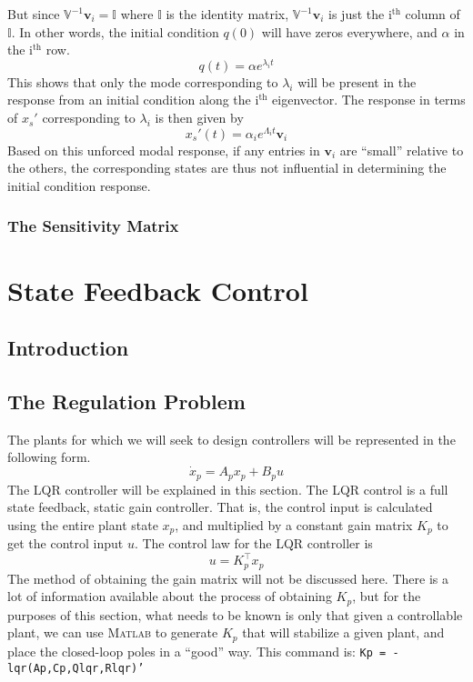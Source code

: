 But since $\mathbb{V}^{-1}\mathrm{\textbf{v}}_{i}=\mathbb{I}$ where $\mathbb{I}$ is the identity matrix, $\mathbb{V}^{-1}\mathrm{\textbf{v}}_{i}$ is just the $\mathrm{i^{th}}$ column of $\mathbb{I}$.
In other words, the initial condition $q(0)$ will have zeros everywhere, and $\alpha$ in the $\mathrm{i^{th}}$ row.
\begin{equation*}
  q(t)=\alpha e^{\lambda_{i}t}
\end{equation*}
This shows that only the mode corresponding to $\lambda_{i}$ will be present in the response from an initial condition along the $\mathrm{i^{th}}$ eigenvector.
The response in terms of $x_{s}'$ corresponding to $\lambda_{i}$ is then given by
\begin{equation*}
  x_{s}'(t)=\alpha_{i}e^{\Lambda_{i}t}\mathrm{\textbf{v}}_{i}
\end{equation*}
Based on this unforced modal response, if any entries in $\mathrm{\textbf{v}}_{i}$ are ``small'' relative to the others, the corresponding states are thus not influential in determining the initial condition response.

\subsection{The Sensitivity Matrix}


\chapter{State Feedback Control}

\section{Introduction}

\section{The Regulation Problem}

The plants for which we will seek to design controllers will be represented in the following form.
\begin{equation*}
  \dot{x}_{p}=A_{p}x_{p}+B_{p}u
\end{equation*}
The LQR controller will be explained in this section.
The LQR control is a full state feedback, static gain controller.
That is, the control input is calculated using the entire plant state $x_{p}$, and multiplied by a constant gain matrix $K_{p}$ to get the control input $u$.
The control law for the LQR controller is
\begin{equation*}
  u=K_{p}^{\top}x_{p}
\end{equation*}
The method of obtaining the gain matrix will not be discussed here.
There is a lot of information available about the process of obtaining $K_{p}$, but for the purposes of this section, what needs to be known is only that given a controllable plant, we can use \textsc{Matlab} to generate $K_{p}$ that will stabilize a given plant, and place the closed-loop poles in a ``good'' way.
This command is: \texttt{Kp = -lqr(Ap,Cp,Qlqr,Rlqr)'}

